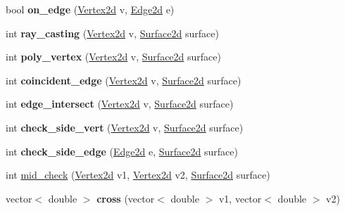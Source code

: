 \begin{DoxyCompactItemize}
\item 
bool {\bfseries on\+\_\+edge} (\hyperlink{classVertex2d}{Vertex2d} v, \hyperlink{classEdge2d}{Edge2d} e)\hypertarget{classprojection_a816e0c9c71772b298d79a1f9acbab2d1}{}\label{classprojection_a816e0c9c71772b298d79a1f9acbab2d1}

\item 
int {\bfseries ray\+\_\+casting} (\hyperlink{classVertex2d}{Vertex2d} v, \hyperlink{classSurface2d}{Surface2d} surface)\hypertarget{classprojection_a66972c8979e1cb1429230f1759c313aa}{}\label{classprojection_a66972c8979e1cb1429230f1759c313aa}

\item 
int {\bfseries poly\+\_\+vertex} (\hyperlink{classVertex2d}{Vertex2d} v, \hyperlink{classSurface2d}{Surface2d} surface)\hypertarget{classprojection_a1850fe07fbd58a9b829dd65d931a73bf}{}\label{classprojection_a1850fe07fbd58a9b829dd65d931a73bf}

\item 
int {\bfseries coincident\+\_\+edge} (\hyperlink{classVertex2d}{Vertex2d} v, \hyperlink{classSurface2d}{Surface2d} surface)\hypertarget{classprojection_af35400b0243e982cbd9f9bee109de1ae}{}\label{classprojection_af35400b0243e982cbd9f9bee109de1ae}

\item 
int {\bfseries edge\+\_\+intersect} (\hyperlink{classVertex2d}{Vertex2d} v, \hyperlink{classSurface2d}{Surface2d} surface)\hypertarget{classprojection_a24d4d8db9c4b68ffd40f9eac528bbbb1}{}\label{classprojection_a24d4d8db9c4b68ffd40f9eac528bbbb1}

\item 
int {\bfseries check\+\_\+side\+\_\+vert} (\hyperlink{classVertex2d}{Vertex2d} v, \hyperlink{classSurface2d}{Surface2d} surface)\hypertarget{classprojection_afcfbb7569b94be5df14f252a1fd62774}{}\label{classprojection_afcfbb7569b94be5df14f252a1fd62774}

\item 
int {\bfseries check\+\_\+side\+\_\+edge} (\hyperlink{classEdge2d}{Edge2d} e, \hyperlink{classSurface2d}{Surface2d} surface)\hypertarget{classprojection_afe27008445491428359590360a821b84}{}\label{classprojection_afe27008445491428359590360a821b84}

\item 
int \hyperlink{classprojection_a09a4b15e0f9a7c687a7d417f4a51aa6e}{mid\+\_\+check} (\hyperlink{classVertex2d}{Vertex2d} v1, \hyperlink{classVertex2d}{Vertex2d} v2, \hyperlink{classSurface2d}{Surface2d} surface)
\item 
vector$<$ double $>$ {\bfseries cross} (vector$<$ double $>$ v1, vector$<$ double $>$ v2)\hypertarget{classprojection_a1bee2adde0b5145710546d870bb39303}{}\label{classprojection_a1bee2adde0b5145710546d870bb39303}

\end{DoxyCompactItemize}
